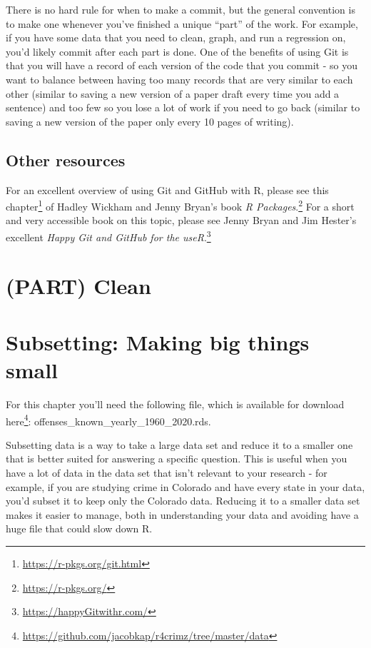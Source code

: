 \documentclass[
  a4paper,
]{krantz}
\renewcommand{\href}[2]{#2\footnote{\url{#1}}}
\begin{document}
There is no hard rule for when to make a commit, but the
general convention is to make one whenever you've finished a
unique ``part'' of the work. For example, if you have some
data that you need to clean, graph, and run a regression on,
you'd likely commit after each part is done. One of the
benefits of using Git is that you will have a record of each
version of the code that you commit - so you want to balance
between having too many records that are very similar to
each other (similar to saving a new version of a paper draft
every time you add a sentence) and too few so you lose a lot
of work if you need to go back (similar to saving a new
version of the paper only every 10 pages of writing).

\hypertarget{other-resources}{%
\section{Other resources}\label{other-resources}}

For an excellent overview of using Git and GitHub with R,
please see \href{https://r-pkgs.org/git.html}{this chapter}
of Hadley Wickham and Jenny Bryan's book
\href{https://r-pkgs.org/}{\emph{R Packages}.} For a short
and very accessible book on this topic, please see Jenny
Bryan and Jim Hester's excellent
\href{https://happyGitwithr.com/}{\emph{Happy Git and GitHub
for the useR}.}

\hypertarget{part-clean}{%
\chapter*{(PART) Clean}\label{part-clean}}

\hypertarget{subsetting-intro}{%
\chapter{Subsetting: Making big things
small}\label{subsetting-intro}}

For this chapter you'll need the following file, which is
available for download
\href{https://github.com/jacobkap/r4crimz/tree/master/data}{here}:
offenses\_known\_yearly\_1960\_2020.rds.

Subsetting data is a way to take a large data set and reduce
it to a smaller one that is better suited for answering a
specific question. This is useful when you have a lot of
data in the data set that isn't relevant to your research -
for example, if you are studying crime in Colorado and have
every state in your data, you'd subset it to keep only the
Colorado data. Reducing it to a smaller data set makes it
easier to manage, both in understanding your data and
avoiding have a huge file that could slow down R.
\end{document}
